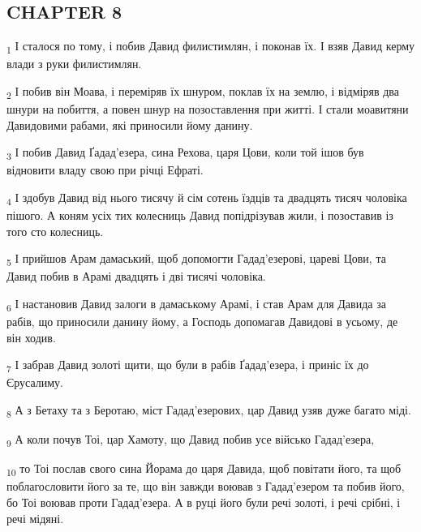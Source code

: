 \subsection{CHAPTER 8}
\begin{tcolorbox}
\textsubscript{1} І сталося по тому, і побив Давид филистимлян, і поконав їх. І взяв Давид керму влади з руки филистимлян.
\end{tcolorbox}
\begin{tcolorbox}
\textsubscript{2} І побив він Моава, і переміряв їх шнуром, поклав їх на землю, і відміряв два шнури на побиття, а повен шнур на позоставлення при житті. І стали моавитяни Давидовими рабами, які приносили йому данину.
\end{tcolorbox}
\begin{tcolorbox}
\textsubscript{3} І побив Давид Ґадад'езера, сина Рехова, царя Цови, коли той ішов був відновити владу свою при річці Ефраті.
\end{tcolorbox}
\begin{tcolorbox}
\textsubscript{4} І здобув Давид від нього тисячу й сім сотень їздців та двадцять тисяч чоловіка пішого. А коням усіх тих колесниць Давид попідрізував жили, і позоставив із того сто колесниць.
\end{tcolorbox}
\begin{tcolorbox}
\textsubscript{5} І прийшов Арам дамаський, щоб допомогти Гадад'езерові, цареві Цови, та Давид побив в Арамі двадцять і дві тисячі чоловіка.
\end{tcolorbox}
\begin{tcolorbox}
\textsubscript{6} І настановив Давид залоги в дамаському Арамі, і став Арам для Давида за рабів, що приносили данину йому, а Господь допомагав Давидові в усьому, де він ходив.
\end{tcolorbox}
\begin{tcolorbox}
\textsubscript{7} І забрав Давид золоті щити, що були в рабів Ґадад'езера, і приніс їх до Єрусалиму.
\end{tcolorbox}
\begin{tcolorbox}
\textsubscript{8} А з Бетаху та з Беротаю, міст Гадад'езерових, цар Давид узяв дуже багато міді.
\end{tcolorbox}
\begin{tcolorbox}
\textsubscript{9} А коли почув Тоі, цар Хамоту, що Давид побив усе військо Гадад'езера,
\end{tcolorbox}
\begin{tcolorbox}
\textsubscript{10} то Тоі послав свого сина Йорама до царя Давида, щоб повітати його, та щоб поблагословити його за те, що він завжди воював з Гадад'езером та побив його, бо Тоі воював проти Гадад'езера. А в руці його були речі золоті, і речі срібні, і речі мідяні.
\end{tcolorbox}
